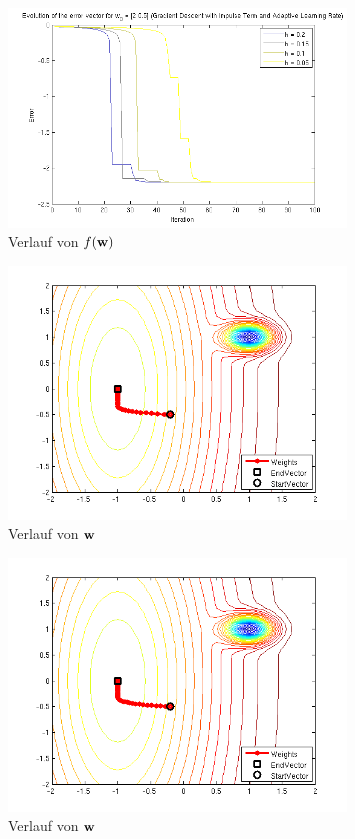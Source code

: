 \begin{figure}[h!]
  \centering
  \includegraphics[width=0.8\textwidth]{./figures/213/error_w01.png}
  \caption{Verlauf von $f(\mathbf{w})$}
  \label{fig:error_w01}
\end{figure}

\begin{figure}[h!]
  \centering
  \includegraphics[width=0.8\textwidth]{./figures/213/path_w02_eta02.png}
  \caption{Verlauf von $\mathbf{w}$}
  \label{fig:path_w02_eta02}
\end{figure}

\begin{figure}[h!]
  \centering
  \includegraphics[width=0.8\textwidth]{./figures/213/path_w02_eta015.png}
  \caption{Verlauf von $\mathbf{w}$}
  \label{fig:path_w02_eta015}
\end{figure}

